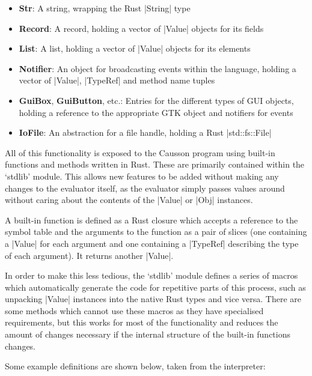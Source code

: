 \documentclass[11pt]{report}
\begin{document}
\begin{itemize}[nosep, topsep=0pt]
    \item \textbf{Str}: A string, wrapping the Rust |String| type

    \item \textbf{Record}: A record, holding a vector of |Value| objects for its fields

    \item \textbf{List}: A list, holding a vector of |Value| objects for its elements

    \item \textbf{Notifier}: An object for broadcasting events within the language, holding a vector of |Value|, |TypeRef| and method name tuples

    \item \textbf{GuiBox}, \textbf{GuiButton}, etc.: Entries for the different types of GUI objects, holding a reference to the appropriate GTK object and notifiers for events
    
    \item \textbf{IoFile}: An abstraction for a file handle, holding a Rust |std::fs::File|
\end{itemize}

All of this functionality is exposed to the Causson program using built-in functions and methods written in Rust. These are primarily contained within the `stdlib' module. This allows new features to be added without making any changes to the evaluator itself, as the evaluator simply passes values around without caring about the contents of the |Value| or |Obj| instances.

A built-in function is defined as a Rust closure which accepts a reference to the symbol table and the arguments to the function as a pair of slices (one containing a |Value| for each argument and one containing a |TypeRef| describing the type of each argument). It returns another |Value|.

In order to make this less tedious, the `stdlib' module defines a series of macros which automatically generate the code for repetitive parts of this process, such as unpacking |Value| instances into the native Rust types and vice versa. There are some methods which cannot use these macros as they have specialised requirements, but this works for most of the functionality and reduces the amount of changes necessary if the internal structure of the built-in functions changes.

Some example definitions are shown below, taken from the interpreter:
\end{document}
